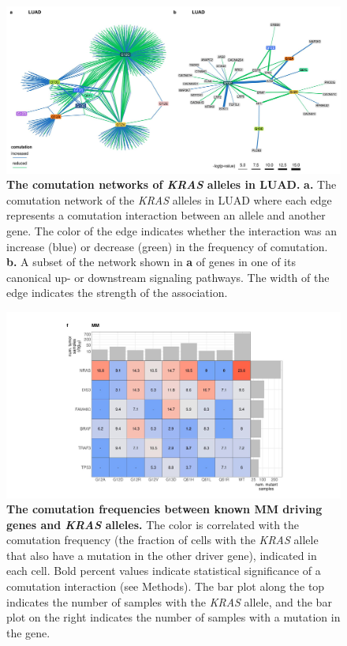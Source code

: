 \documentclass[english, 10pt, letterpaper]{article}
\newcommand{\KRAS}{\emph{KRAS}}
\begin{document}
\begin{figure}[h!]
\centering
\includegraphics[width=180mm]{figures/Supp_Fig_2.jpeg}
\caption{
    \textbf{The comutation networks of \KRAS{} alleles in LUAD.}
    \textbf{a.} The comutation network of the \KRAS{} alleles in LUAD where each edge represents a comutation interaction between an allele and another gene. The color of the edge indicates whether the interaction was an increase (blue) or decrease (green) in the frequency of comutation.
    \textbf{b.} A subset of the network shown in \textbf{a} of genes in one of its canonical up- or downstream signaling pathways. The width of the edge indicates the strength of the association.
}
\label{sfig:luad-comutation-network}
\end{figure}
\newpage


\begin{figure}[h!]
\centering
\includegraphics[width=180mm]{figures/Supp_Fig_3.jpeg}
\caption{
    \textbf{The comutation frequencies between known MM driving genes and \KRAS{} alleles.} The color is correlated with the comutation frequency (the fraction of cells with the \KRAS{} allele that also have a mutation in the other driver gene), indicated in each cell. Bold percent values indicate statistical significance of a comutation interaction (see Methods). The bar plot along the top indicates the number of samples with the \KRAS{} allele, and the bar plot on the right indicates the number of samples with a mutation in the gene.
}
\label{sfig:mm-comutation-heatmap}
\end{figure}
\newpage
\end{document}
